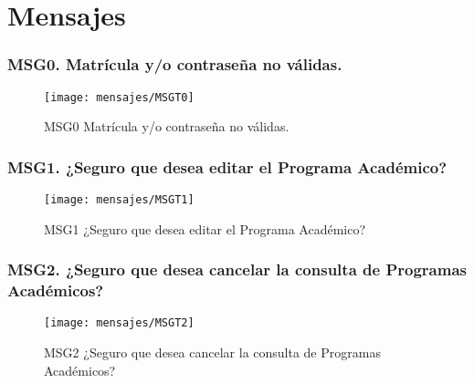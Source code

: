 \chapter{Mensajes}

\subsection{MSG0. Matrícula y/o contraseña no válidas.}
    \begin{figure}[htbp]
        \begin{center}
            \texttt{[image: mensajes/MSGT0]}
            \caption{MSG0 Matrícula y/o contraseña no válidas.}
            \label{fig:MSG0}
        \end{center}
    \end{figure}
    
\subsection{MSG1. ¿Seguro que desea editar el Programa Académico?}
    \begin{figure}[htbp]
        \begin{center}
            \texttt{[image: mensajes/MSGT1]}
            \caption{MSG1 ¿Seguro que desea editar el Programa Académico?}
            \label{fig:MSG1}
        \end{center}
    \end{figure}
    
\subsection{MSG2. ¿Seguro que desea cancelar la consulta de Programas Académicos?}
    \begin{figure}[htbp]
        \begin{center}
            \texttt{[image: mensajes/MSGT2]}
            \caption{MSG2 ¿Seguro que desea cancelar la consulta de Programas Académicos?}
            \label{fig:MSG2}
        \end{center}
    \end{figure}
    
